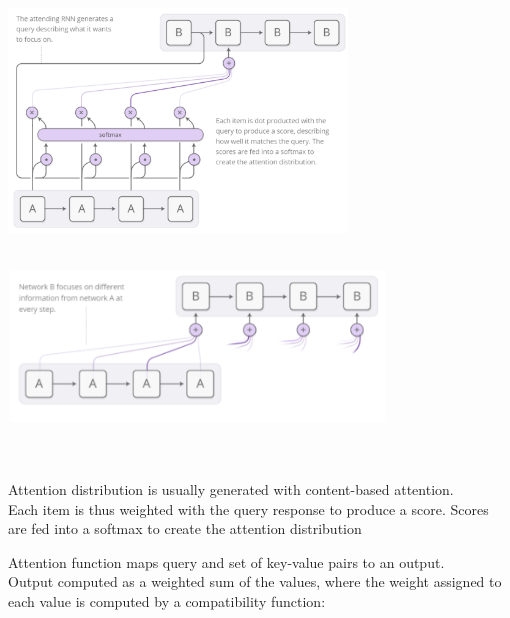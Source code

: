 \begin{minipage}{\linewidth}
\centering
\hspace*{-2cm}    
\begin{minipage}{9cm}
  \includegraphics[width=9cm, height=7cm]{images/attentionsoft.PNG}
\end{minipage}%
\begin{minipage}{10cm}
  \centering
  \includegraphics[width=10cm, height=4cm]{images/attentionsoft_right.png}
\end{minipage}
\end{minipage}\\ \\

Attention distribution is usually generated with content-based attention.\\
Each item is thus weighted with the query response to produce a score. Scores are fed into a softmax to create the attention distribution

Attention function maps query and set of key-value pairs to an output. \\
Output computed as a weighted sum of the values, where the weight assigned to each value is computed by a compatibility function:


